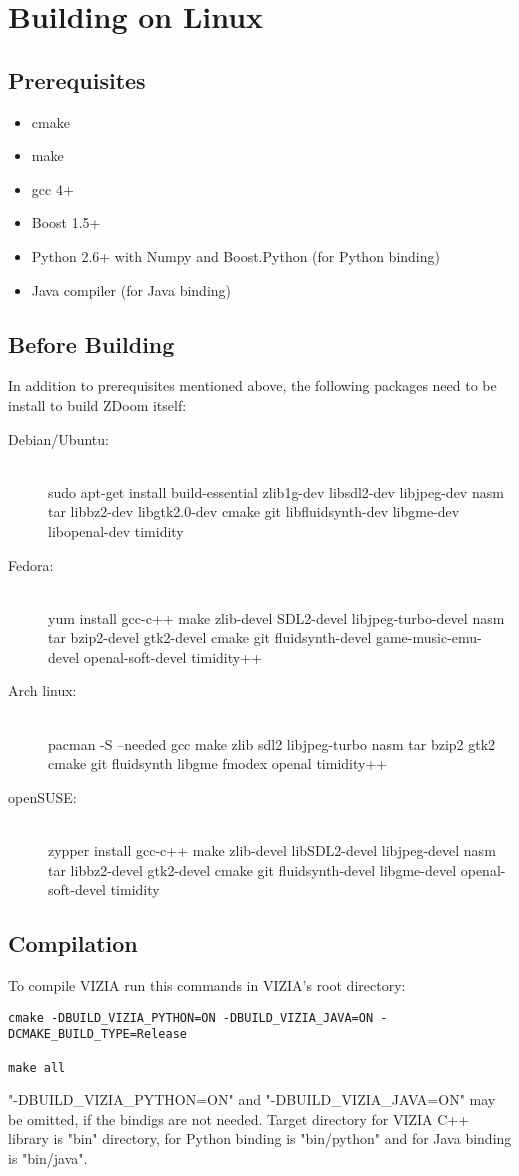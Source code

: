 \chapter{Building on Linux}
\section{Prerequisites}
\begin{itemize}
\item cmake
\item make
\item gcc 4+
\item Boost 1.5+
\item Python 2.6+ with Numpy and Boost.Python (for Python binding)
\item Java compiler (for Java binding)
\end{itemize}
\section{Before Building}
	In addition to prerequisites mentioned above, the following packages need to be install to build ZDoom itself:
	\begin{description}
		\item[Debian/Ubuntu:] \hfill \\
		sudo apt-get install build-essential zlib1g-dev libsdl2-dev libjpeg-dev nasm tar libbz2-dev libgtk2.0-dev cmake git libfluidsynth-dev libgme-dev libopenal-dev timidity
		\item[Fedora:] \hfill \\
		yum install gcc-c++ make zlib-devel SDL2-devel libjpeg-turbo-devel nasm tar bzip2-devel gtk2-devel cmake git fluidsynth-devel game-music-emu-devel	openal-soft-devel timidity++
		\item[Arch linux:] \hfill \\
		pacman -S --needed gcc make zlib sdl2 libjpeg-turbo nasm tar bzip2 gtk2 cmake git fluidsynth libgme fmodex openal timidity++
		\item[openSUSE:] \hfill \\
		zypper install gcc-c++ make zlib-devel libSDL2-devel libjpeg-devel nasm tar libbz2-devel gtk2-devel cmake git fluidsynth-devel libgme-devel openal-soft-devel timidity
	\end{description}
\section{Compilation}
To compile VIZIA run this commands in VIZIA's root directory:
	\begin{lstlisting}
cmake -DBUILD_VIZIA_PYTHON=ON -DBUILD_VIZIA_JAVA=ON -DCMAKE_BUILD_TYPE=Release

make all
    \end{lstlisting}

"-DBUILD\_VIZIA\_PYTHON=ON" and "-DBUILD\_VIZIA\_JAVA=ON" may be omitted, if the bindigs are not needed.
Target directory for VIZIA C++ library is "bin" directory, for Python binding is "bin/python" and for Java binding is "bin/java".

